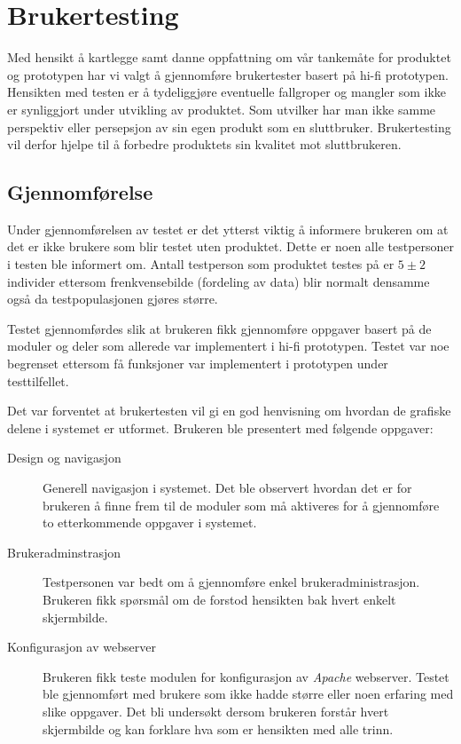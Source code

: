 \chapter{Brukertesting}
\lettrine[lines=2]{M}{}ed hensikt å kartlegge samt danne oppfattning om vår tankemåte for produktet og prototypen har vi valgt å gjennomføre brukertester basert på hi-fi prototypen. 
Hensikten med testen er å tydeliggjøre eventuelle fallgroper og mangler som ikke er synliggjort under utvikling av produktet.
Som utvilker har man ikke samme perspektiv eller persepsjon av sin egen produkt som en sluttbruker. Brukertesting vil derfor hjelpe til å forbedre produktets sin kvalitet mot sluttbrukeren.

\section{Gjennomførelse}
Under gjennomførelsen av testet er det ytterst viktig å informere brukeren om at det er ikke brukere som blir testet uten produktet.
Dette er noen alle testpersoner i testen ble informert om. 
Antall testperson som produktet testes på er $5 \pm 2$ individer ettersom frenkvensebilde (fordeling av data) blir normalt densamme også da testpopulasjonen gjøres større.\cite{lazar2010research}\cite{book:utforming}

Testet gjennomførdes slik at brukeren fikk gjennomføre oppgaver basert på de moduler og deler som allerede var implementert i hi-fi prototypen. 
Testet var noe begrenset ettersom få funksjoner var implementert i prototypen under testtilfellet.

Det var forventet at brukertesten vil gi en god henvisning om hvordan de grafiske delene i systemet er utformet.
Brukeren ble presentert med følgende oppgaver:
\begin{description}
\item[Design og navigasjon]
Generell navigasjon i systemet. 
Det ble observert hvordan det er for brukeren å finne frem til de moduler som må aktiveres for å gjennomføre to etterkommende oppgaver i systemet.

\item[Brukeradminstrasjon]
Testpersonen var bedt om å gjennomføre enkel brukeradministrasjon. 
Brukeren fikk spørsmål om de forstod hensikten bak hvert enkelt skjermbilde.

\item[Konfigurasjon av webserver]
Brukeren fikk teste modulen for konfigurasjon av \textit{Apache} webserver. 
Testet ble gjennomført med brukere som ikke hadde større eller noen erfaring med slike oppgaver.
Det bli undersøkt dersom brukeren forstår hvert skjermbilde og kan forklare hva som er hensikten med alle trinn.
\end{description}

